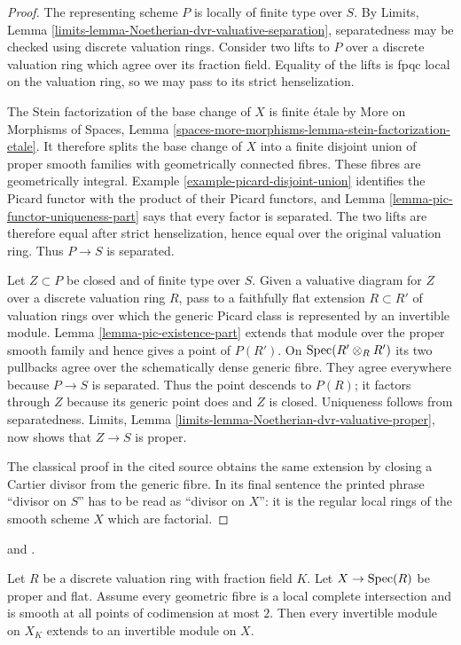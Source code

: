 \begin{proof}
The representing scheme $P$ is locally of finite type over $S$. By Limits,
Lemma \ref{limits-lemma-Noetherian-dvr-valuative-separation}, separatedness
may be checked using discrete valuation rings. Consider two lifts to $P$ over
a discrete valuation ring which agree over its fraction field. Equality of
the lifts is fpqc local on the valuation ring, so we may pass to its strict
henselization.

The Stein factorization of the base change of $X$ is finite \'etale by More on
Morphisms of Spaces, Lemma
\ref{spaces-more-morphisms-lemma-stein-factorization-etale}. It therefore
splits the base change of $X$ into a finite disjoint union of proper smooth
families with geometrically connected fibres. These fibres are geometrically
integral. Example \ref{example-picard-disjoint-union} identifies the Picard
functor with the product of their Picard functors, and Lemma
\ref{lemma-pic-functor-uniqueness-part} says that every factor is separated.
The two lifts are therefore equal after strict henselization, hence equal over
the original valuation ring. Thus $P\to S$ is separated.

Let $Z\subset P$ be closed and of finite type over $S$. Given a valuative
diagram for $Z$ over a discrete valuation ring $R$, pass to a faithfully flat
extension $R\subset R'$ of valuation rings over which the generic Picard
class is represented by an invertible module. Lemma
\ref{lemma-pic-existence-part} extends that module over the proper smooth
family and hence gives a point of $P(R')$. On
$\mathop{\mathrm{Spec}}(R'\otimes_RR')$ its two pullbacks agree over the schematically dense
generic fibre. They agree everywhere because $P\to S$ is separated. Thus the
point descends to $P(R)$; it factors through $Z$ because its generic point
does and $Z$ is closed. Uniqueness follows from separatedness. Limits, Lemma
\ref{limits-lemma-Noetherian-dvr-valuative-proper}, now shows that $Z\to S$
is proper.

The classical proof in the cited source obtains the same extension by closing
a Cartier divisor from the generic fibre. In its final sentence the printed
phrase ``divisor on $S$'' has to be read as ``divisor on $X$'': it is the
regular local rings of the smooth scheme $X$ which are factorial.
\end{proof}

\begin{lemma}
\label{lemma-pic-flat-lci-codimension-two-extension}
\begin{reference}
\cite[Expos\'e 236, Remark 2.2, pp. 231--232]{FGA} and
\cite[Expos\'e XI, Corollaire 3.14]{SGA2}.
\end{reference}
Let $R$ be a discrete valuation ring with fraction field $K$. Let $X\to
\mathop{\mathrm{Spec}}(R)$ be proper and flat. Assume every geometric fibre is a local complete
intersection and is smooth at all points of codimension at most $2$. Then
every invertible module on $X_K$ extends to an invertible module on $X$.
\end{lemma}

